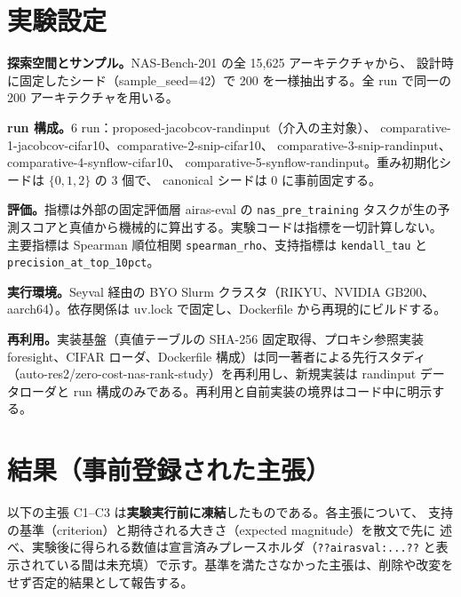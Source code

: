 \documentclass[11pt]{article}
\begin{document}
\section{実験設定}
\textbf{探索空間とサンプル。}NAS-Bench-201 の全 15{,}625 アーキテクチャから、
設計時に固定したシード（sample\_seed=42）で 200 を一様抽出する。全 run で同一の
200 アーキテクチャを用いる。

\textbf{run 構成。}6 run：proposed-jacobcov-randinput（介入の主対象）、
comparative-1-jacobcov-cifar10、comparative-2-snip-cifar10、
comparative-3-snip-randinput、comparative-4-synflow-cifar10、
comparative-5-synflow-randinput。重み初期化シードは $\{0,1,2\}$ の 3 個で、
canonical シードは 0 に事前固定する。

\textbf{評価。}指標は外部の固定評価層 airas-eval の \texttt{nas\_pre\_training}
タスクが生の予測スコアと真値から機械的に算出する。実験コードは指標を一切計算しない。
主要指標は Spearman 順位相関 \texttt{spearman\_rho}、支持指標は
\texttt{kendall\_tau} と \texttt{precision\_at\_top\_10pct}。

\textbf{実行環境。}Seyval 経由の BYO Slurm クラスタ（RIKYU、NVIDIA GB200、
aarch64）。依存関係は uv.lock で固定し、Dockerfile から再現的にビルドする。

\textbf{再利用。}実装基盤（真値テーブルの SHA-256 固定取得、プロキシ参照実装
foresight、CIFAR ローダ、Dockerfile 構成）は同一著者による先行スタディ
（auto-res2/zero-cost-nas-rank-study）を再利用し、新規実装は randinput
データローダと run 構成のみである。再利用と自前実装の境界はコード中に明示する。

\section{結果（事前登録された主張）}\label{sec:results}
以下の主張 C1–C3 は\textbf{実験実行前に凍結}したものである。各主張について、
支持の基準（criterion）と期待される大きさ（expected magnitude）を散文で先に
述べ、実験後に得られる数値は宣言済みプレースホルダ（\texttt{??airasval:...??}
と表示されている間は未充填）で示す。基準を満たさなかった主張は、削除や改変を
せず否定的結果として報告する。
\end{document}
